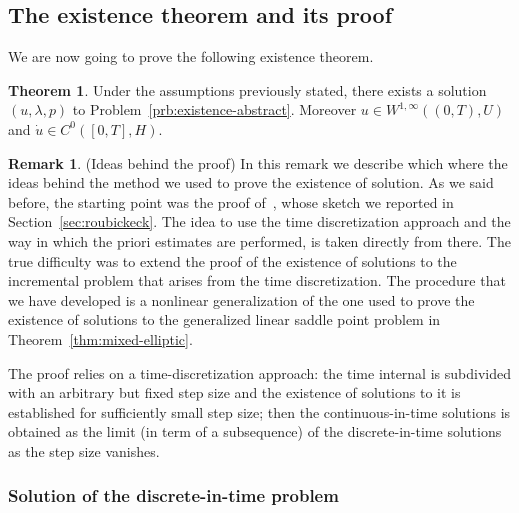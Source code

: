 \documentclass[a4paper,10pt,twoside]{amsbook}
\numberwithin{section}{chapter}
\numberwithin{equation}{chapter}
\theoremstyle{definition}
\newtheorem{thm}[prop]{Theorem}
\newtheorem{rmk}[prop]{Remark}
\begin{document}
\subsection{The existence theorem and its proof}

We are now going to prove the following existence theorem.
\begin{thm}
\label{thm:abstract-existence}
Under the assumptions previously stated, there exists a solution $(u,\lambda,p)$ to Problem~\ref{prb:existence-abstract}. Moreover $u\in W^{1,\infty}((0,T),U)$ and $\dot u\in C^0([0,T],H)$.
\end{thm}
\begin{rmk}(Ideas behind the proof)
In this remark we describe which where the ideas behind the method we used to prove the existence of solution. As we said before, the starting point was the proof of~\cite[Proposition~11.1]{roubicek-pde}, whose sketch we reported in Section~\ref{sec:roubickeck}. The idea to use the time discretization approach and the way in which the priori estimates are performed, is taken directly from there. The true difficulty was to extend the proof of the existence of solutions to the incremental problem that arises from the time discretization. The procedure that we have developed is a nonlinear generalization of the one used to prove the existence of solutions to the generalized linear saddle point problem in Theorem~\ref{thm:mixed-elliptic}.
\end{rmk}

The proof relies on a time-discretization approach: the time internal is subdivided with an arbitrary but fixed step size and the existence of solutions to it is established for sufficiently small step size; then the continuous-in-time solutions is obtained as the limit (in term of a subsequence) of the discrete-in-time solutions as the step size vanishes.

\subsubsection*{Solution of the discrete-in-time problem}
\end{document}

